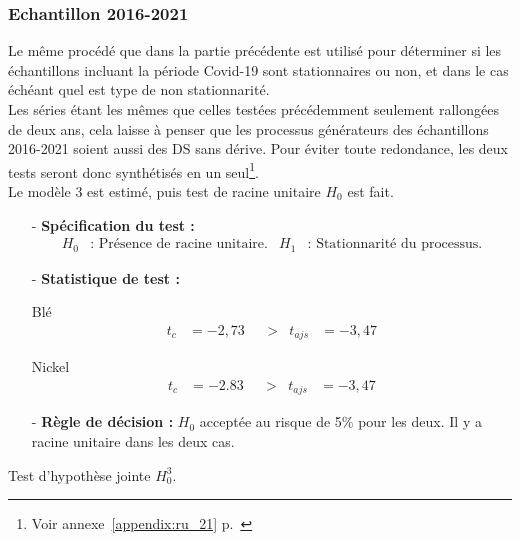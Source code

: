 \subsubsection{Echantillon 2016-2021}
Le même procédé que dans la partie précédente est utilisé pour déterminer si les échantillons incluant la période Covid-19 sont stationnaires ou non, et dans le cas 
échéant quel est type de non stationnarité.\\[11pt]
Les séries étant les mêmes que celles testées précédemment seulement rallongées de deux ans, cela laisse à penser que les processus générateurs des échantillons 
2016-2021 soient aussi des DS sans dérive. Pour éviter toute redondance, les deux tests seront donc synthétisés en un 
seul\footnote{Voir annexe~\ref{appendix:ru_21} p.~\pageref{appendix:ru_21}}.\\[11pt]
Le modèle 3 est estimé, puis test de racine unitaire $H_{0}$ est fait.
\begin{itemize}
    \item[-]\textbf{Spécification du test :} 
    \begin{align*}
        H_{0} &: \text{ Présence de racine unitaire.} & H_{1} &: \text{ Stationnarité du processus.}
    \end{align*}
    \item[-]\textbf{Statistique de test :} 
    \begin{multicols}{2}
    \centering Blé
    \begin{align*}
            t_{c} &= -2,73 & &> & t_{ajs} &= -3,47
    \end{align*}

    \columnbreak

    \centering Nickel
    \begin{align*}
        t_{c} &=  -2.83  & &> & t_{ajs} &= -3,47
    \end{align*}
    \end{multicols}
    \item[-]\textbf{Règle de décision :} $H_{0}$ acceptée au risque de 5\% pour les deux. Il y a racine unitaire dans les deux cas.
    \end{itemize}
    Test d'hypothèse jointe $H_{0}^{3}$.
